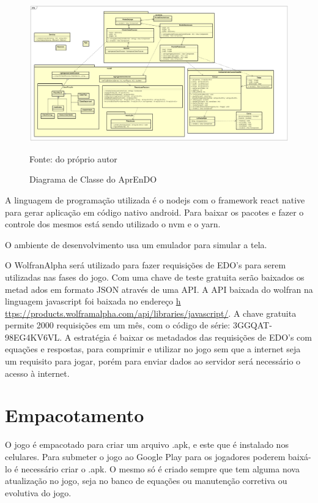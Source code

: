 \begin{figure}[H]
\centering
\caption{Diagrama de Classe do AprEnDO}
\includegraphics[scale=0.4]{figuras/diagramaClasse0_2.png}

\small{Fonte: do próprio autor}
\end{figure}


A linguagem de programação utilizada é o nodejs com o framework react native para gerar aplicação em código nativo android. Para baixar os pacotes e fazer o controle dos mesmos está sendo utilizado o nvm e o yarn.

O ambiente de desenvolvimento usa um emulador para simular a tela.

O WolfranAlpha será utilizado para fazer requisições de EDO's para serem utilizadas nas fases do jogo. Com uma chave de teste gratuita serão baixados os metad    ados em formato JSON através de uma API.
A API baixada do wolfran na linguagem javascript foi baixada no endereço \url{h    ttps://products.wolframalpha.com/api/libraries/javascript/}.
A chave gratuita permite 2000 requisições em um mês, com o código de série: 3GGQAT-98EG4KV6VL. A estratégia é baixar os metadados das requisições de EDO's com     equações e respostas, para comprimir e utilizar no jogo sem que a internet seja um requisito para jogar, porém para enviar dados ao servidor será necessário o acesso à internet.

\section[Empacotamento]{Empacotamento}
O jogo é empacotado para criar um arquivo .apk, e este que é instalado nos celulares. Para submeter o jogo ao Google Play para os jogadores poderem baixá-lo é necessário criar o .apk. O mesmo só é criado sempre que tem alguma nova atualização no jogo, seja no banco de equações ou manutenção corretiva ou evolutiva do jogo.

